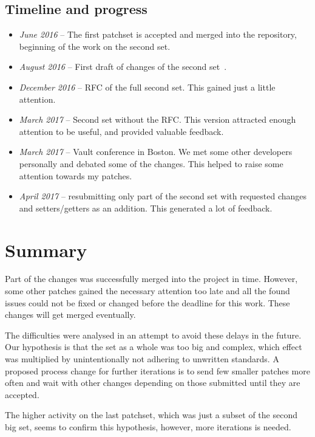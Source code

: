 \subsection{Timeline and progress}

\begin{itemize}
	\item {\em June 2016} -- The first patchset is accepted and merged into
		the repository, beginning of the work on the second set.
	\item {\em August 2016} -- First draft of changes of the second set~\cite{secondSetPreRFC}.
	\item {\em December 2016} -- RFC of the full second set. This gained just a little attention.
	\item {\em March 2017} -- Second set without the RFC. This version attracted enough attention to be useful, and provided valuable feedback.
	\item {\em March 2017} -- Vault conference in Boston. We met some other developers personally and debated some of the changes. This helped to raise some attention towards my patches.
	\item {\em April 2017} -- resubmitting only part of the second set with requested changes and setters/getters as an addition. This generated a lot of feedback.
\end{itemize}


\section{Summary}\label{chap:refactoring:summary}

Part of the changes was successfully merged into the project in time.
However, some other patches gained the necessary attention too late and all
the found issues could not be fixed or changed before the deadline for this
work. These changes will get merged eventually.

The difficulties were analysed in an attempt to avoid these delays in the future.
Our hypothesis is that the set as a whole was too big and complex, which effect
was multiplied by unintentionally not adhering to unwritten standards. A
proposed process change for further iterations is to send few smaller patches
more often and wait with other changes depending on those submitted until they
are accepted.

The higher activity on the last patchset, which was just a subset of the second
big set, seems to confirm this hypothesis, however, more iterations is needed.

